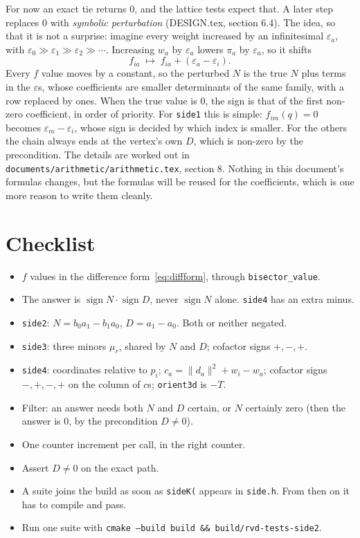 \documentclass[11pt,a4paper]{article}
\newcommand{\code}[1]{\texttt{#1}}
\newcommand{\norm}[1]{\lVert #1\rVert}
\newcommand{\sgn}{\operatorname{sign}}
\theoremstyle{remark}
\begin{document}
For now an exact tie returns 0, and the lattice tests expect that. A later step replaces 0 with
\emph{symbolic perturbation} (DESIGN.tex, section 6.4). The idea, so that it is not a surprise:
imagine every weight increased by an infinitesimal $\varepsilon_a$, with
$\varepsilon_0 \gg \varepsilon_1 \gg \varepsilon_2 \gg \cdots$. Increasing $w_a$ by
$\varepsilon_a$ lowers $\pi_a$ by $\varepsilon_a$, so it shifts
\[
  f_{ia} \;\longmapsto\; f_{ia} + (\varepsilon_a - \varepsilon_i).
\]
Every $f$ value moves by a constant, so the perturbed $N$ is the true $N$ plus terms in the
$\varepsilon$s, whose coefficients are smaller determinants of the same family, with a row
replaced by ones. When the true value is 0, the sign is that of the first non-zero coefficient,
in order of priority. For \code{side1} this is simple: $f_{im}(q) = 0$ becomes
$\varepsilon_m - \varepsilon_i$, whose sign is decided by which index is smaller. For the others
the chain always ends at the vertex's own $D$, which is non-zero by the precondition. The details
are worked out in \code{documents/arithmetic/arithmetic.tex}, section 8. Nothing in this document's formulas changes, but the
formulas will be reused for the coefficients, which is one more reason to write them cleanly.

\section{Checklist}\label{sec:checklist}

\begin{itemize}
  \item $f$ values in the difference form~\eqref{eq:diffform}, through \code{bisector\_value}.
  \item The answer is $\sgn N\cdot\sgn D$, never $\sgn N$ alone. \code{side4} has an extra minus.
  \item \code{side2}: $N = b_0a_1 - b_1a_0$, $D = a_1 - a_0$. Both or neither negated.
  \item \code{side3}: three minors $\mu_r$, shared by $N$ and $D$; cofactor signs $+,-,+$.
  \item \code{side4}: coordinates relative to $p_i$; $c_a = \norm{d_a}^2 + w_i - w_a$; cofactor
    signs $-,+,-,+$ on the column of $c$s; \code{orient3d} is $-T$.
  \item Filter: an answer needs both $N$ and $D$ certain, or $N$ certainly zero (then the answer is
    0, by the precondition $D \neq 0$).
  \item One counter increment per call, in the right counter.
  \item Assert $D \neq 0$ on the exact path.
  \item A suite joins the build as soon as \code{sideK(} appears in \code{side.h}. From then on it
    has to compile and pass.
  \item Run one suite with \code{cmake --build build \&\& build/rvd-tests-side2}.
\end{itemize}
\end{document}

